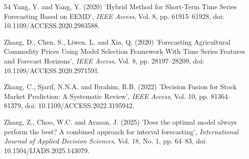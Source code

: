 \begin{thebibliography}{54}
Yang, Y. and Yang, Y. (2020) 'Hybrid Method for Short-Term Time Series Forecasting Based on EEMD', {\it IEEE Access}, Vol. 8, pp. 61915--61928, doi: 10.1109/ACCESS.2020.2983588.

Zhang, D., Chen, S., Liwen, L. and Xia, Q. (2020) 'Forecasting Agricultural Commodity Prices Using Model Selection Framework With Time Series Features and Forecast Horizons', {\it IEEE Access}, Vol. 8, pp. 28197--28209, doi: 10.1109/ACCESS.2020.2971591.

Zhang, C., Sjarif, N.N.A. and Ibrahim, R.B. (2022) 'Decision Fusion for Stock Market Prediction: A Systematic Review', {\it IEEE Access}, Vol. 10, pp. 81364--81379, doi: 10.1109/ACCESS.2022.3195942.

Zhang, Z., Choo, W.C. and Arasan, J. (2025) 'Does the optimal model always perform the best? A combined approach for interval forecasting', {\it International Journal of Applied Decision Sciences}, Vol. 18, No. 1, pp. 64--83, doi: 10.1504/IJADS.2025.143079.

\end{thebibliography}
